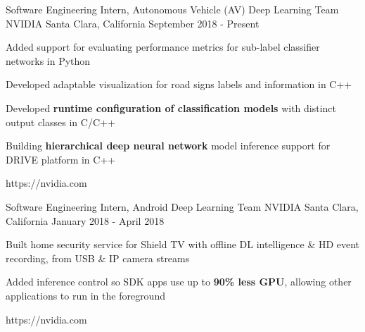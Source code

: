 


\begin{cventries}


\cventrylink
{Software Engineering Intern, Autonomous Vehicle (AV) Deep Learning Team}
{NVIDIA}
{Santa Clara, California}
{September 2018 - Present}
{ %
\begin{cvitems}
\item{Added support for evaluating performance metrics for sub-label classifier networks in Python}
\item{Developed adaptable visualization for road signs labels and information in C++}
\item{Developed \textbf{runtime configuration of classification models} with distinct output classes in C/C++}
\item{Building \textbf{hierarchical deep neural network} model inference support for DRIVE platform in C++}
\end{cvitems}
}
{https://nvidia.com}


\cventrylink
{Software Engineering Intern, Android Deep Learning Team}
{NVIDIA}
{Santa Clara, California}
{January 2018 - April 2018}
{ %
\begin{cvitems}
\item{Built home security service for Shield TV with offline DL intelligence \& HD event recording, from USB \& IP camera streams}
\item{Added inference control so SDK apps use up to \textbf{90\% less GPU}, allowing other applications to run in the foreground}
\end{cvitems}
}
{https://nvidia.com}



\end{cventries}
